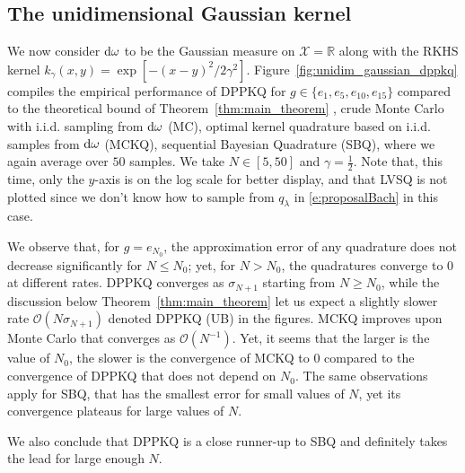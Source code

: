\documentclass[twoside,11pt]{book}
\numberwithin{theorem}{chapter}
\numberwithin{definition}{chapter}
\numberwithin{proposition}{chapter}
\numberwithin{corollary}{chapter}
\numberwithin{example}{chapter}
\numberwithin{lemma}{chapter}
\numberwithin{assumption}{chapter}
\newcommand{\rb}[1]{\textcolor{magenta}{#1}}
\begin{document}
\subsection{The unidimensional Gaussian kernel}\label{s:gaussian_numsim}
We now consider $\rm{d}\omega$ to be the Gaussian measure on $\mathcal{X} = \mathbb{R}$ along with the RKHS kernel $\displaystyle k_{\gamma}(x,y) = \exp[-(x-y)^{2}/2\gamma^{2}]$. Figure~\ref{fig:unidim_gaussian_dppkq} compiles the empirical performance of DPPKQ for $g \in \{e_{1},e_{5},e_{10},e_{15}\}$ compared to the theoretical bound of Theorem~\ref{thm:main_theorem} , crude Monte Carlo with i.i.d. sampling from $\rm{d}\omega$ (MC), optimal kernel quadrature based on i.i.d. samples from $\rm{d}\omega$ (MCKQ), sequential Bayesian Quadrature (SBQ), where we again average over $50$ samples.
We take $N \in [5,50]$ and $\gamma = \frac{1}{2}$. Note that, this time, only the $y$-axis is on the log scale for better display, and that LVSQ is not plotted since we don't know how to sample from $q_\lambda$ in \eqref{e:proposalBach} in this case.
%

We observe that, for $g = e_{N_{0}}$, the approximation error of any quadrature does not decrease significantly for $N \leq N_{0}$; yet, for $N > N_{0}$, the quadratures converge to $0$ at different rates. DPPKQ converges as $\sigma_{N+1}$ starting from $N\geq N_{0}$, while the discussion below Theorem~\ref{thm:main_theorem} let us expect a slightly slower rate $\mathcal{O}(N\sigma_{N+1})$ denoted DPPKQ (UB) in the figures. MCKQ improves upon Monte Carlo that converges as $\mathcal{O}(N^{-1})$. Yet, it seems that the larger is the value of $N_0$, the slower is the convergence of MCKQ to $0$ compared to the convergence of DPPKQ that does not depend on $N_0$.
 The same observations apply for SBQ, that has the smallest error for small values of $N$, yet its convergence plateaus for large values of $N$.

We also conclude that DPPKQ is a close runner-up to SBQ and definitely takes the lead for large enough $N$.


\end{document}
